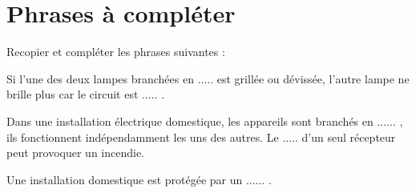 \section{Phrases à compléter}

Recopier et compléter les phrases suivantes :

\begin{questions}
	\question Si l'une des deux lampes branchées en ..... est grillée ou dévissée, l'autre lampe ne brille plus car le circuit est ..... .
	
	\question Dans une installation électrique  domestique, les appareils sont branchés en ...... , ils fonctionnent indépendamment les uns des autres. Le ..... d'un seul récepteur peut provoquer un incendie.
	
	\question Une installation domestique est protégée par un ...... .
	
\end{questions}